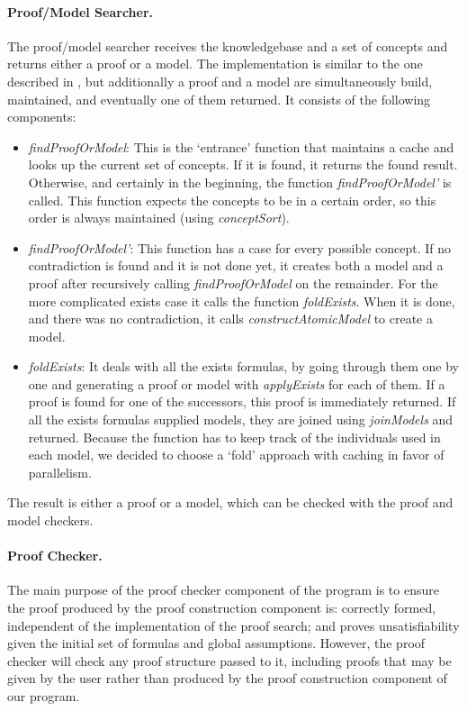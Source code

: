\paragraph{Proof/Model Searcher.} 

The proof/model searcher receives the knowledgebase and a set of concepts and returns
either a proof or a model. The implementation is similar to the one described in
\cite{gore07}, but additionally a proof and a model are simultaneously build, maintained,
and eventually one of them returned. It consists of the following components:
\begin{itemize}
\item \emph{findProofOrModel}: This is the `entrance' function that maintains
a cache and looks up the current set of concepts. If it is found, it returns the
found result. Otherwise, and certainly in the beginning, the function
\emph{findProofOrModel'} is called. This function expects the concepts to be in
a certain order, so this order is always maintained (using \emph{conceptSort}).

\item \emph{findProofOrModel'}: This function has a case for every possible concept. If no
contradiction is found and it is not done yet, it creates both a model and a proof
after recursively calling \emph{findProofOrModel} on the remainder. For the more
complicated
exists case it calls the function \emph{foldExists}. When it is done, and there was no
contradiction, it calls \emph{constructAtomicModel} to create a model.

\item \emph{foldExists}: It deals with all the exists formulas, by going through them
one by one and generating a proof or model with \emph{applyExists}
for each of them. If a proof is found for one of
the successors, this proof is immediately returned. If all the exists formulas
supplied models, they are joined using \emph{joinModels} and returned. Because
the function has to keep track of the individuals used in each model, we decided
to choose a `fold' approach with caching in favor of parallelism.
\end{itemize}
The result is either a proof or a model, which can be checked with the proof and
model checkers.


\paragraph{Proof Checker.}

The main purpose of the proof checker component of the program is to ensure the proof produced by the proof construction component is: correctly formed, independent of the implementation of the proof search; and proves unsatisfiability given the initial set of formulas and global assumptions. However, the proof checker will check any proof structure passed to it, including proofs that may be given by the user rather than produced by the proof construction component of our program.

